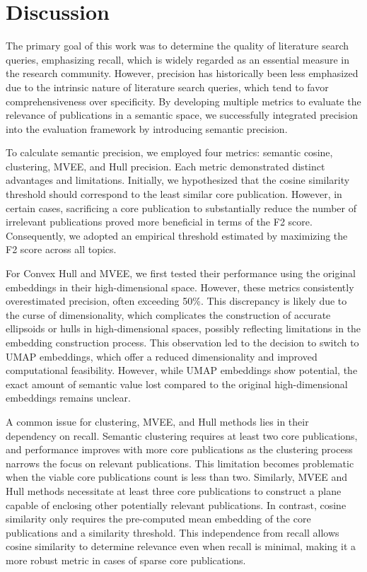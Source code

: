 \section{Discussion}

The primary goal of this work was to determine the quality of literature search queries, emphasizing recall, which is widely regarded as an essential measure in the research community. However, precision has historically been less emphasized due to the intrinsic nature of literature search queries, which tend to favor comprehensiveness over specificity. By developing multiple metrics to evaluate the relevance of publications in a semantic space, we successfully integrated precision into the evaluation framework by introducing semantic precision.

To calculate semantic precision, we employed four metrics: semantic cosine, clustering, MVEE, and Hull precision. Each metric demonstrated distinct advantages and limitations. Initially, we hypothesized that the cosine similarity threshold should correspond to the least similar core publication. However, in certain cases, sacrificing a core publication to substantially reduce the number of irrelevant publications proved more beneficial in terms of the F2 score. Consequently, we adopted an empirical threshold estimated by maximizing the F2 score across all topics.

For Convex Hull and MVEE, we first tested their performance using the original embeddings in their high-dimensional space. However, these metrics consistently overestimated precision, often exceeding 50\%. This discrepancy is likely due to the curse of dimensionality, which complicates the construction of accurate ellipsoids or hulls in high-dimensional spaces, possibly reflecting limitations in the embedding construction process. This observation led to the decision to switch to UMAP embeddings, which offer a reduced dimensionality and improved computational feasibility. However, while UMAP embeddings show potential, the exact amount of semantic value lost compared to the original high-dimensional embeddings remains unclear.

A common issue for clustering, MVEE, and Hull methods lies in their dependency on recall. Semantic clustering requires at least two core publications, and performance improves with more core publications as the clustering process narrows the focus on relevant publications. This limitation becomes problematic when the viable core publications count is less than two. Similarly, MVEE and Hull methods necessitate at least three core publications to construct a plane capable of enclosing other potentially relevant publications. In contrast, cosine similarity only requires the pre-computed mean embedding of the core publications and a similarity threshold. This independence from recall allows cosine similarity to determine relevance even when recall is minimal, making it a more robust metric in cases of sparse core publications.





